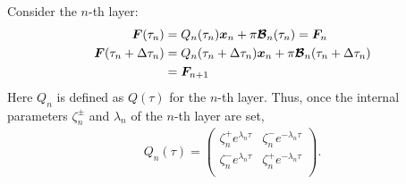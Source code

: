 Consider the $n$-th layer:
\begin{align}
\label{eq:Fv1}
    \boldsymbol{F} (\tau_n) &= Q_n(\tau_n) \boldsymbol{x}_n + \pi \boldsymbol{\mathcal{B}}_n (\tau_n) = \boldsymbol{F}_n\\
\label{eq:Fv2}
    \boldsymbol{F} (\tau_n+\Delta \tau_n) &= Q_n(\tau_n + \Delta \tau_n) \boldsymbol{x}_n + \pi \boldsymbol{\mathcal{B}}_n (\tau_n + \Delta \tau_n) \nonumber \\
    &= \boldsymbol{F}_{n+1}
\end{align}
Here $Q_n$ is defined as $Q(\tau)$ for the $n$-th layer. Thus, once the internal parameters $\zeta^\pm_n$ and $\lambda_n$ of the $n$-th layer are set,
\begin{align}
    Q_n(\tau) = \left(
\begin{array}{cc}
\zeta^+_n e^{\lambda_n \tau} & \zeta^-_n e^{-\lambda_n \tau}  \\
\zeta^-_n e^{\lambda_n \tau} & \zeta^+_n e^{-\lambda_n \tau}  \\
\end{array}
\right).
\end{align}

